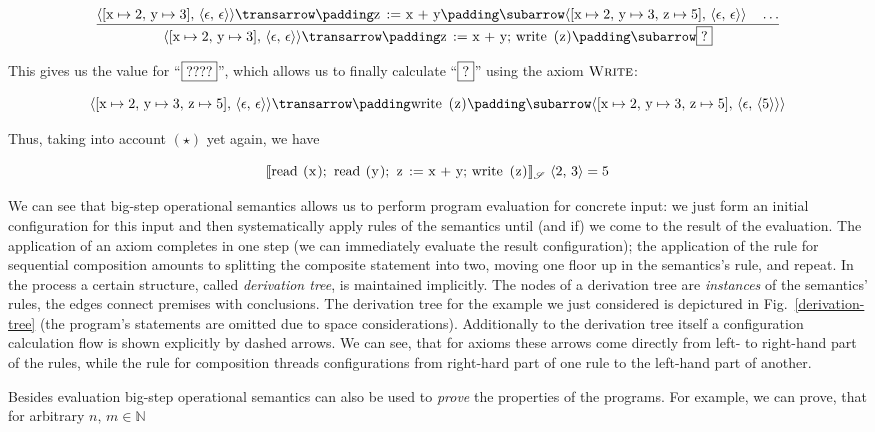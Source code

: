 \[
\trule{\trans{\inbr{[\llang{x}\mapsto 2,\,\llang{y}\mapsto 3],\,\inbr{\epsilon,\,\epsilon}}}{\llang{z := x + y}}{\inbr{[\llang{x}\mapsto 2,\,\llang{y}\mapsto 3,\,\llang{z}\mapsto 5],\,\inbr{\epsilon,\,\epsilon}}}\quad
       \dots}
      {\trans{\inbr{[\llang{x}\mapsto 2,\,\llang{y}\mapsto 3],\,\inbr{\epsilon,\,\epsilon}}}{\llang{z := x + y; write (z)}}{\fbox{?}}}
\]

This gives us the value for ``$\fbox{????}$'', which allows us to finally calculate ``$\fbox{?}$'' using the axiom $\textsc{Write}$:

\[
\trans{\inbr{[\llang{x}\mapsto 2,\,\llang{y}\mapsto 3,\,\llang{z}\mapsto 5],\,\inbr{\epsilon,\,\epsilon}}}{\llang{write (z)}}{\inbr{[\llang{x}\mapsto 2,\,\llang{y}\mapsto 3,\,\llang{z}\mapsto 5],\,\inbr{\epsilon,\,\inbr{5}}}}
\]

Thus, taking into account $(\star)$ yet again, we have

\[
\sembr{\llang{read (x); read (y); z := x + y; write (z)}}^\ph_\mathscr{S}\,\inbr{2,\,3}=5
\]

We can see that big-step operational semantics allows us to perform program evaluation for concrete input: we just form an initial configuration for this input and then
systematically apply rules of the semantics until (and if) we come to the result of the evaluation. The application of an axiom completes in one
step (we can immediately evaluate the result configuration); the application of the rule for sequential composition amounts to splitting the composite
statement into two, moving one floor up in the semantics's rule, and repeat. In the process a certain structure, called \emph{derivation tree}, is
maintained implicitly. The nodes of a derivation tree are \emph{instances} of the semantics' rules, the edges connect premises with conclusions. The derivation
tree for the example we just considered is depictured in Fig.~\ref{derivation-tree} (the program's statements are omitted due to space considerations). Additionally
to the derivation tree itself a configuration calculation flow is shown explicitly by dashed arrows. We can see, that for axioms these arrows come directly from
left- to right-hand part of the rules, while the rule for composition threads configurations from right-hard part of one rule to the left-hand part of another.

Besides evaluation big-step operational semantics can also be used to \emph{prove} the properties of the programs. For example, we can prove, that for
arbitrary $n,\, m\in\mathbb{N}$ 

